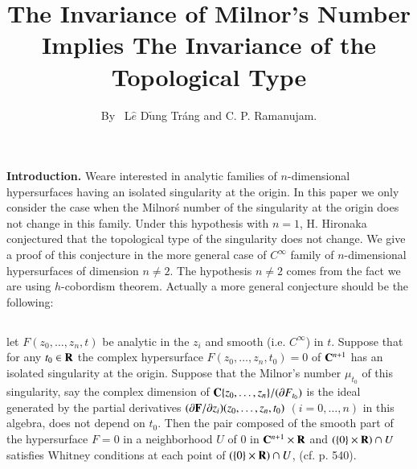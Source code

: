 \title{The Invariance of Milnor's Number Implies The Invariance of the Topological Type}\label{art10}

\author{By~ L$\hat{e}$ D$\tilde{\text{u}}$ng Tr\'ang and C. P. Ramanujam.}

\date{}
\maketitle


\setcounter{page}{135}

{\bf Introduction.}  
\setcounter{pageoriginal}{106}
We\pageoriginale are interested in analytic
families of $n$-dimen\-sional hypersurfaces having an isolated
singularity at the origin. In this paper we only consider the case
when the Milnor\'s number of the singularity at the origin does not
change in this family. Under this hypothesis with $n=1$, H. Hironaka
conjectured that the topological type of the singularity does not
change. We give a proof of this conjecture in the more general case of
$C^\infty$ family of $n$-dimensional hypersurfaces of dimension $n
\neq 2$. The hypothesis $n \neq 2$ comes from the fact we are using
$h$-cobordism theorem. Actually a more general conjecture should be
the following:


\subsection{}%
let $F(z_0,\ldots, z_n, t)$ be analytic in the $z_i$ and smooth (i.e. $C^\infty$) in $t$. Suppose that for any $t_0 \in \mathbf{R}$ the complex hypersurface $F (z_0,\ldots, z_n, t_0)=0$ of $\mathbf{C}^{n+1}$ has an isolated singularity at the origin. Suppose that the Milnor's number $\mu_{t_0}$ of this singularity, say the complex dimension of $\mathbf{C} \{z_0, \ldots, z_n\} / (\partial F_{t_0})$ is the ideal generated by the partial derivatives \break $(\partial \mathbf{F} / \partial z_i) (z_0, \ldots, z_n, t_0)$ $(i=0, \ldots, n)$ in this algebra, does not depend on $t_0$. Then the pair composed of the smooth part of the hypersurface $F=0$ in a neighborhood $U$ of $0$ in $\mathbf{C}^{n+1} \times \mathbf{R}$ and $(\{0\} \times \mathbf{R}) \cap U$ satisfies Whitney conditions at each point of $(\{0\} \times\mathbf{R}) \cap U$, (cf. \cite{art10-key17} p. 540).

